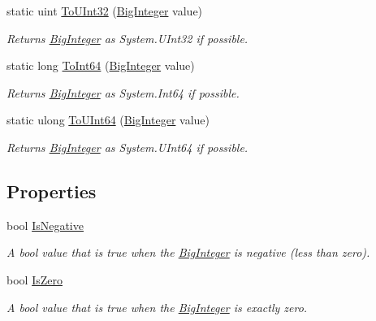 \begin{DoxyCompactItemize}
static uint \hyperlink{class_scott_garland_1_1_big_integer_a89c18ca36b64bb368c7e96906a750537}{To\+U\+Int32} (\hyperlink{class_scott_garland_1_1_big_integer}{Big\+Integer} value)
\begin{DoxyCompactList}\small\item\em Returns \hyperlink{class_scott_garland_1_1_big_integer}{Big\+Integer} as System.\+U\+Int32 if possible. \end{DoxyCompactList}\item 
static long \hyperlink{class_scott_garland_1_1_big_integer_ae0fc996dd71a2fb206e03230c1534a6a}{To\+Int64} (\hyperlink{class_scott_garland_1_1_big_integer}{Big\+Integer} value)
\begin{DoxyCompactList}\small\item\em Returns \hyperlink{class_scott_garland_1_1_big_integer}{Big\+Integer} as System.\+Int64 if possible. \end{DoxyCompactList}\item 
static ulong \hyperlink{class_scott_garland_1_1_big_integer_a5b75b559d0c7ec75ff4eaceb1cdee2a4}{To\+U\+Int64} (\hyperlink{class_scott_garland_1_1_big_integer}{Big\+Integer} value)
\begin{DoxyCompactList}\small\item\em Returns \hyperlink{class_scott_garland_1_1_big_integer}{Big\+Integer} as System.\+U\+Int64 if possible. \end{DoxyCompactList}\end{DoxyCompactItemize}
\subsection*{Properties}
\begin{DoxyCompactItemize}
\item 
bool \hyperlink{class_scott_garland_1_1_big_integer_a3bed3f2524ecfac198f5d93cfccad0b0}{Is\+Negative}
\begin{DoxyCompactList}\small\item\em A bool value that is true when the \hyperlink{class_scott_garland_1_1_big_integer}{Big\+Integer} is negative (less than zero). \end{DoxyCompactList}\item 
bool \hyperlink{class_scott_garland_1_1_big_integer_ad925705201ff656dc819599e78a19ccd}{Is\+Zero}
\begin{DoxyCompactList}\small\item\em A bool value that is true when the \hyperlink{class_scott_garland_1_1_big_integer}{Big\+Integer} is exactly zero. \end{DoxyCompactList}\end{DoxyCompactItemize}



